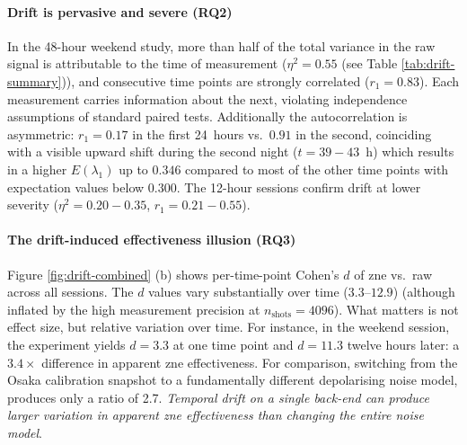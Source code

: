 \documentclass[10pt,conference]{IEEEtran}
\begin{document}
\paragraph{Drift is pervasive and severe (RQ2)}
In the 48-hour weekend study, more than half of the total variance in the raw signal is attributable to the time of measurement ($\eta^2 = 0.55$ (see Table \ref{tab:drift-summary})), and consecutive time points are strongly correlated ($r_1 = 0.83$). Each measurement carries information about the next, violating independence assumptions of standard paired tests. Additionally the autocorrelation is asymmetric: $r_1 = 0.17$ in the first 24~hours vs.\ $0.91$ in the second, coinciding with a visible upward shift during the second night ($t = 39{-}43$~h) which results in a higher $E(\lambda_1)$ up to $0.346$ compared to most of the other time points with expectation values below $0.300$. The 12-hour sessions confirm drift at lower severity ($\eta^2 = 0.20{-}0.35$, $r_1 = 0.21{-}0.55$).

\paragraph{The drift-induced effectiveness illusion (RQ3)}
Figure \ref{fig:drift-combined} (b) shows per-time-point Cohen's $d$ of \gls{zne} vs.\ raw across all sessions. The $d$ values vary substantially over time ($3.3$--$12.9$) (although inflated by the high measurement precision at $n_\text{shots} = 4096$). What matters is not effect size, but relative variation over time. For instance, in the weekend session, the experiment yields $d = 3.3$ at one time point and $d = 11.3$ twelve hours later: a $3.4\times$ difference in apparent \gls{zne} effectiveness. For comparison, switching from the Osaka calibration snapshot to a fundamentally different depolarising noise model, produces only a ratio of 2.7. \emph{Temporal drift on a single back-end can produce larger variation in apparent \gls{zne} effectiveness than changing the entire noise model}.
\end{document}
